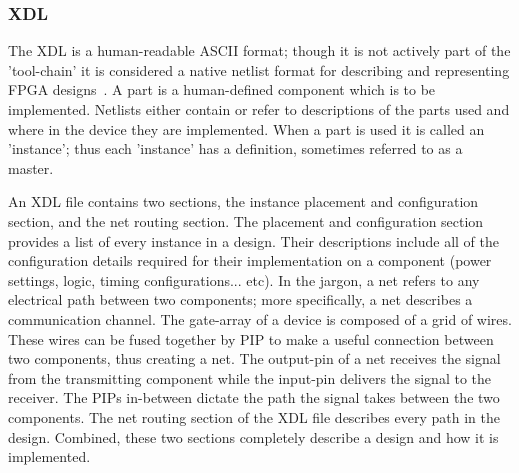 \subsubsection{\acrfull{XDL}}
The \acrfull{XDL} is a human-readable ASCII format; though it is not actively part of the 'tool-chain' it is considered a native netlist format for describing and representing \acrshort{FPGA} designs~\cite{xdlTutorial}. 
A part is a human-defined component which is to be implemented.
Netlists either contain or refer to descriptions of the parts used and where in the device they are implemented.
When a part is used it is called an 'instance'; thus each 'instance' has a definition, sometimes referred to as a master.

An \acrshort{XDL} file contains two sections, the instance placement and configuration section, and the net routing section. 
The placement and configuration section provides a list of every instance in a design. 
Their descriptions include all of the configuration details required for their implementation on a component (power settings, logic, timing configurations... etc).
In the \Xilinx jargon, a net refers to any electrical path between two components; more specifically, a net describes a communication channel.
The gate-array of a \Xilinx device is composed of a grid of wires.
These wires can be fused together by \acrfull{PIP} to make a useful connection between two components, thus creating a net.
The output-pin of a net receives the signal from the transmitting component while the input-pin delivers the signal to the receiver.
The \acrshort{PIP}s in-between dictate the path the signal takes between the two components.
The net routing section of the \acrshort{XDL} file describes every path in the design.
Combined, these two sections completely describe a design and how it is implemented.
